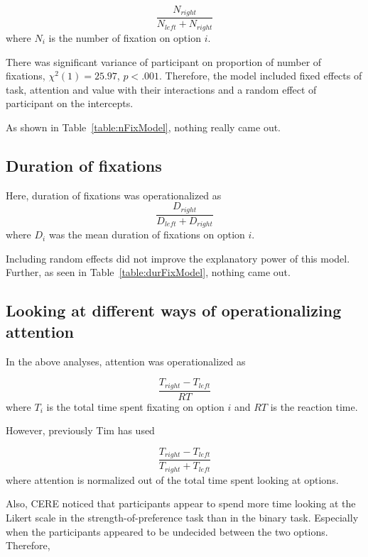 \documentclass[12pt]{article}
\begin{document}
\begin{equation}
	\frac{N_{right}}{N_{left}+N_{right}}
\end{equation}
where $N_i$ is the number of fixation on option $i$. 

There was significant variance of participant on proportion of number of fixations, $\chi^2(1)=25.97$, $p<.001$. Therefore, the model included fixed effects of task, attention and value with their interactions and a random effect of participant on the intercepts. 



As shown in Table~\ref{table:nFixModel}, nothing really came out. 

\subsection{Duration of fixations}
Here, duration of fixations was operationalized as 
\begin{equation}
	\frac{D_{right}}{D_{left} + D_{right}}
\end{equation}
where $D_i$ was the mean duration of fixations on option $i$. 

Including random effects did not improve the explanatory power of this model. Further, as seen in Table~\ref{table:durFixModel}, nothing came out. 



\subsection{Looking at different ways of operationalizing attention}
In the above analyses, attention was operationalized as 

\begin{equation}
	\frac{T_{right}-T_{left}}{RT}	
\end{equation}
where $T_i$ is the total time spent fixating on option $i$ and $RT$ is the reaction time. 

However, previously Tim has used

\begin{equation}
	\frac{T_{right}-T_{left}}{T_{right}+T_{left}}
\end{equation}
where attention is normalized out of the total time spent looking at options. 

Also, CERE noticed that participants appear to spend more time looking at the Likert scale in the strength-of-preference task than in the binary task. Especially when the participants appeared to be undecided between the two options. Therefore, 
\end{document}
